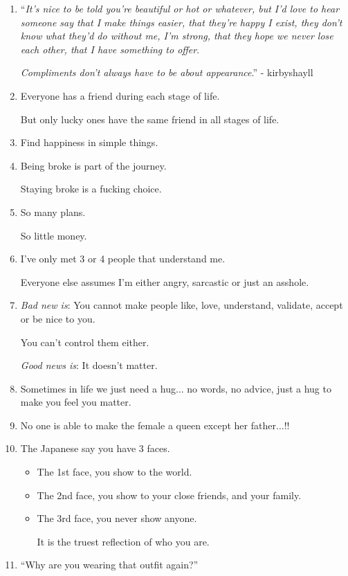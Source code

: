 \documentclass{article}
\numberwithin{equation}{section}
\begin{document}
\begin{enumerate}
    Because the depth of your love today is the depth of your wound tomorrow.
    \item ``\textit{It's nice to be told you're beautiful or hot or whatever, but I'd love to hear someone say that I make things easier, that they're happy I exist, they don't know what they'd do without me, I'm strong, that they hope we never lose each other, that I have something to offer}.
    
    \textit{Compliments don't always have to be about appearance}.'' - kirbyshayll
    \item Everyone has a friend during each stage of life.
    
    But only lucky ones have the same friend in all stages of life.
    \item Find happiness in simple things.
    \item Being broke is part of the journey.
    
    Staying broke is a fucking choice.
    \item So many plans.
    
    So little money.
    \item I've only met 3 or 4 people that understand me.
    
    Everyone else assumes I'm either angry, sarcastic or just an asshole.
    \item \textit{Bad new is}: You cannot make people like, love, understand, validate, accept or be nice to you.
    
    You can't control them either.
    
    \textit{Good news is}: It doesn't matter.
    \item Sometimes in life we just need a hug$\ldots$ no words, no advice, just a hug to make you feel you matter.
    \item No one is able to make the female a queen except her father$\ldots$!!
    \item The Japanese say you have 3 faces.
    \begin{itemize}
        \item The 1st face, you show to the world.
        \item The 2nd face, you show to your close friends, and your family.
        \item The 3rd face, you never show anyone.
        
        It is the truest reflection of who you are.
    \end{itemize}
    \item ``Why are you wearing that outfit again?''
    

\end{enumerate}
\end{document}

